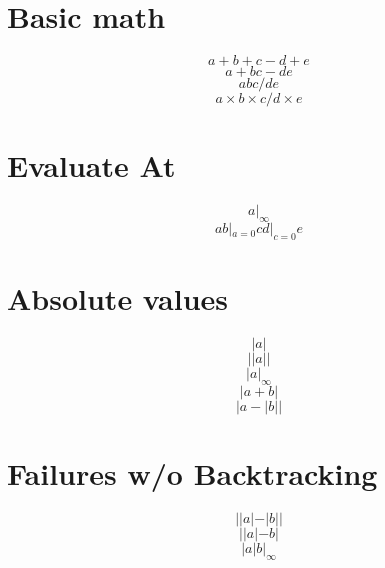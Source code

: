 \documentclass{article}
\begin{document}
%
%
%
%
%

\section{Basic math}
\[ a + b + c - d + e \]
\[ a + b c - d  e \]
\[ a b c / d e \]
\[ a \times b \times c / d \times e \]

\section{Evaluate At}
\[  a |_\infty \]
\[ a b |_{a=0} c d |_{c=0} e \]

\section{Absolute values}
\[  |a| \]
\[ ||a|| \]
\[  |a |_\infty \]
\[  |a + b| \]
\[  |a - |b|| \]

\section{Failures w/o Backtracking}
\[  ||a| - |b|| \]
\[ ||a|-b| \]
\[  |a | b |_\infty \]
\end{document}
